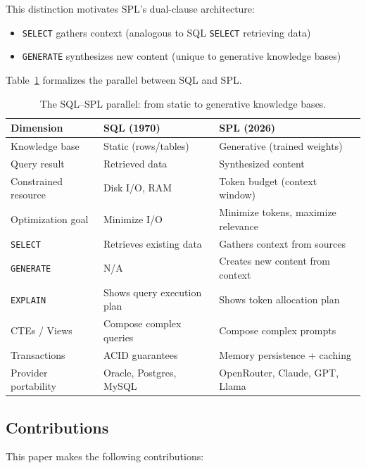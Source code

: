 \documentclass[11pt,a4paper]{article}
\begin{document}
This distinction motivates SPL's dual-clause architecture:
\begin{itemize}[nosep]
  \item \texttt{SELECT} gathers context (analogous to SQL \texttt{SELECT} retrieving data)
  \item \texttt{GENERATE} synthesizes new content (unique to generative knowledge bases)
\end{itemize}

Table~\ref{tab:sql-spl-parallel} formalizes the parallel between SQL and SPL.

\begin{table}[h]
\centering
\caption{The SQL--SPL parallel: from static to generative knowledge bases.}
\label{tab:sql-spl-parallel}
\begin{tabular}{@{}lll@{}}
\toprule
\textbf{Dimension} & \textbf{SQL (1970)} & \textbf{SPL (2026)} \\
\midrule
Knowledge base & Static (rows/tables) & Generative (trained weights) \\
Query result & Retrieved data & Synthesized content \\
Constrained resource & Disk I/O, RAM & Token budget (context window) \\
Optimization goal & Minimize I/O & Minimize tokens, maximize relevance \\
\texttt{SELECT} & Retrieves existing data & Gathers context from sources \\
\texttt{GENERATE} & N/A & Creates new content from context \\
\texttt{EXPLAIN} & Shows query execution plan & Shows token allocation plan \\
CTEs / Views & Compose complex queries & Compose complex prompts \\
Transactions & ACID guarantees & Memory persistence + caching \\
Provider portability & Oracle, Postgres, MySQL & OpenRouter, Claude, GPT, Llama \\
\bottomrule
\end{tabular}
\end{table}

\subsection{Contributions}

This paper makes the following contributions:
\end{document}
